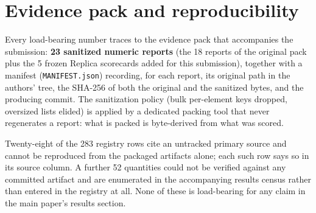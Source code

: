 \section{Evidence pack and reproducibility}
\label{ssec:pack}

Every load-bearing number traces to the evidence pack that accompanies the
submission: \textbf{23 sanitized numeric reports} (the 18 reports of the
original pack plus the 5 frozen Replica scorecards added for this submission),
together with a manifest (\texttt{MANIFEST.json}) recording, for each
report, its original path in the authors' tree, the SHA-256 of both the
original and the sanitized bytes, and the producing commit. The sanitization
policy (bulk per-element keys dropped, oversized lists elided) is applied by
a dedicated packing tool that never regenerates a report: what is packed is
byte-derived from what was scored.

Twenty-eight of the 283 registry rows cite an untracked primary source and
cannot be reproduced from the packaged artifacts alone; each such row says
so in its source column. A further 52 quantities could not be verified
against any committed artifact and are enumerated in the accompanying
results census rather than entered in the registry at all. None of these is
load-bearing for any claim in the main paper's results section.
